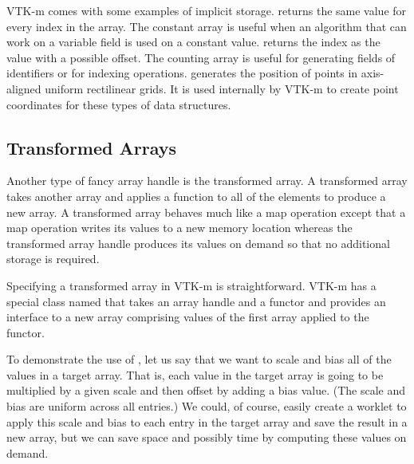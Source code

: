 
VTK-m comes with some examples of implicit storage.
 returns the same value for every index in
the array. The constant array is useful when an algorithm that can work on
a variable field is used on a constant value.
 returns the index as the value with a
possible offset. The counting array is useful for generating fields of
identifiers or for indexing operations.
 generates the position of
points in axis-aligned uniform rectilinear grids. It is used internally by
VTK-m to create point coordinates for these types of data structures.


\subsection{Transformed Arrays}
\label{sec:TransformedArrays}


Another type of fancy array handle is the transformed array. A transformed
array takes another array and applies a function to all of the elements to
produce a new array. A transformed array behaves much like a map operation
except that a map operation writes its values to a new memory location
whereas the transformed array handle produces its values on demand so that
no additional storage is required.

Specifying a transformed array in VTK-m is straightforward. VTK-m has a
special class named  that takes an array
handle and a functor and provides an interface to a new array comprising
values of the first array applied to the functor.

To demonstrate the use of , let us say
that we want to scale and bias all of the values in a target array. That
is, each value in the target array is going to be multiplied by a given
scale and then offset by adding a bias value. (The scale and bias are
uniform across all entries.) We could, of course, easily create a worklet
to apply this scale and bias to each entry in the target array and save the
result in a new array, but we can save space and possibly time by computing
these values on demand.

